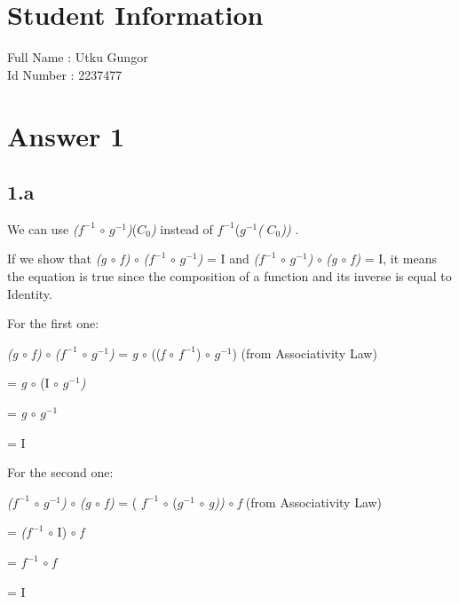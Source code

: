 \documentclass[12pt]{article}
\begin{document}
\section*{Student Information } 
Full Name : Utku Gungor \\
Id Number : 2237477 \\

\section*{Answer 1}
\subsection*{1.a}
\hspace{15px} We can use \textit{($f^{-1}$} $\circ$ \textit{$g^{-1}$)}(\textit{$C_0$)} instead of \textit{$f^{-1}$}(\textit{$g^{-1}$(} \textit{$C_0$))} . \par 
If we show that \textit{(g $\circ$ f)} $\circ$ \textit{($f^{-1}$} $\circ$ \textit{$g^{-1}$)} = I and \textit{($f^{-1}$} $\circ$ \textit{$g^{-1}$)} $\circ$ \textit{(g $\circ$ f)} = I, it means the equation is true since the composition of a function and its inverse is equal to Identity. \par 
For the first one: \par 
\textit{(g $\circ$ f)} $\circ$ \textit{($f^{-1}$} $\circ$ \textit{$g^{-1}$)} = \textit{g} $\circ$ ((\textit{f} $\circ$ \textit{$f^{-1}$}) $\circ$ \textit{$g^{-1}$})    \hspace{20px}   (from Associativity Law) \par 
\hspace{108px} = \textit{g} $\circ$ (I $\circ$
\textit{$g^{-1}$)}  \par
\hspace{108px} = \textit{g} $\circ$ \textit{$g^{-1}$} \par 
\hspace{108px} = I \par 
For the second one: \par 
\textit{($f^{-1}$} $\circ$ \textit{$g^{-1}$)} $\circ$ \textit{(g $\circ$ f)} = ( \textit{$f^{-1}$} $\circ$ (\textit{$g^{-1}$} $\circ$ \textit{g))} $\circ$ \textit{f}  \hspace{20px}   (from Associativity Law) \par 
\hspace{108px} = \textit{($f^{-1}$} $\circ$ I) $\circ$ \textit{f} \par 
\hspace{108px} = \textit{$f^{-1}$} $\circ$ \textit{f} \par
\hspace{108px} = I \par 
\end{document}
